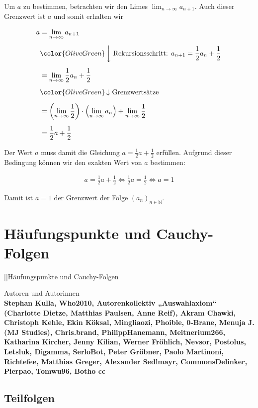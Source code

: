 \documentclass[fontsize=9pt,
               parskip=half-,
               DIV=14,
               listof=chapterentry,
               tocflat]{scrbook}
\newenvironment{authors}{\par\vspace*{\fill}\color{white}Autoren und
Autorinnen\\\bfseries}{\clearpage}
\begin{document}
Um $a$ zu bestimmen, betrachten wir den Limes $\lim _{n\to \infty }a_{n+1}$. Auch dieser Grenzwert ist $a$ und somit erhalten wir

\begin{align*}
a&=\lim _{n\to \infty }a_{n+1}\\[0.5em]&{\color {OliveGreen}\left\downarrow \ {\text{Rekursionsschritt: }}a_{n+1}={\frac {1}{2}}a_{n}+{\frac {1}{2}}\right.}\\[0.5em]&=\lim _{n\to \infty }{\frac {1}{2}}a_{n}+{\frac {1}{2}}\\[0.5em]&{\color {OliveGreen}\left\downarrow \ {\text{Grenzwertsätze}}\right.}\\[0.5em]&=\left(\lim _{n\to \infty }{\frac {1}{2}}\right)\cdot \left(\lim _{n\to \infty }a_{n}\right)+\lim _{n\to \infty }{\frac {1}{2}}\\[0.5em]&={\frac {1}{2}}a+{\frac {1}{2}}
\end{align*}

Der Wert $a$ muss damit die Gleichung $a={\tfrac {1}{2}}a+{\tfrac {1}{2}}$ erfüllen. Aufgrund dieser Bedingung können wir den exakten Wert von $a$ bestimmen:

\begin{align*}
a={\frac {1}{2}}a+{\frac {1}{2}}\iff {\frac {1}{2}}a={\frac {1}{2}}\iff a=1
\end{align*}

Damit ist $a=1$ der Grenzwert der Folge $(a_{n})_{n\in \mathbb {N} }$.

\part{Häufungspunkte und Cauchy-Folgen}

[]{Häufungspunkte und Cauchy-Folgen}\begin{authors}
Stephan Kulla, Who2010, Autorenkollektiv „Auswahlaxiom“ (Charlotte Dietze, Matthias Paulsen, Anne Reif), Akram Chawki, Christoph Kehle, Ekin Köksal, Mingliaozi, Phoible, 0-Brane, Menuja J. (MJ Studies), Chris.brand, PhilippHanemann, Meitnerium266, Katharina Kircher, Jenny Kilian, Werner Fröhlich, Nevsor, Postolus, Letsluk, Digamma, SerloBot, Peter Gröbner, Paolo Martinoni, Richtefee, Matthias Greger, Alexander Sedlmayr, CommonsDelinker, Pierpao, Tomwu96, Botho cc\end{authors}

\chapter{Teilfolgen}
\end{document}
